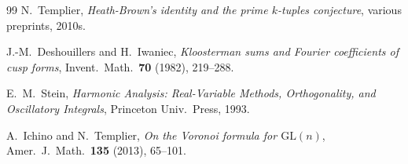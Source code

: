 \documentclass[11pt]{article}
\theoremstyle{definition}
\begin{document}
\begin{thebibliography}{99}
 N.~Templier, \emph{Heath-Brown's identity and the prime $k$-tuples conjecture}, various preprints, 2010s.

 J.-M.~Deshouillers and H.~Iwaniec, \emph{Kloosterman sums and Fourier coefficients of cusp forms}, Invent.\ Math.\ \textbf{70} (1982), 219--288.

 E.~M.~Stein, \emph{Harmonic Analysis: Real-Variable Methods, Orthogonality, and Oscillatory Integrals}, Princeton Univ.\ Press, 1993.

 A.~Ichino and N.~Templier, \emph{On the Voronoi formula for $\mathrm{GL}(n)$}, Amer.\ J.\ Math.\ \textbf{135} (2013), 65--101.

\end{thebibliography}
\end{document}
